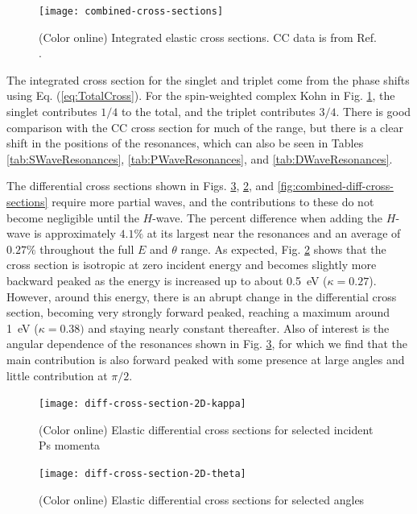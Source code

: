 \documentclass[preprint,showpacs,showkeys,preprintnumbers,amsmath,amssymb,longbibliography,pra,aps]{revtex4-1}
\begin{document}
\begin{figure}[H]
	\centering
	\texttt{[image: combined-cross-sections]}
	\caption{(Color online) Integrated elastic cross sections. CC data is from
Ref. \cite{Walters2004}.}
	\label{fig:combined-cross-sections}
\end{figure}

The integrated cross section for the singlet and triplet come from the phase 
shifts using Eq. (\ref{eq:TotalCross}). For the spin-weighted complex Kohn in 
Fig. \ref{fig:combined-cross-sections}, the singlet contributes $1/4$ to the 
total, and the triplet contributes $3/4$. There is good comparison with the 
CC cross section \cite{Walters2004} for much of the range, but there is a 
clear shift in the positions of the resonances, which can also be seen in 
Tables \ref{tab:SWaveResonances}, \ref{tab:PWaveResonances}, and
\ref{tab:DWaveResonances}.

The differential cross sections shown in Figs.
\ref{fig:diff-cross-section-2D-theta}, \ref{fig:diff-cross-section-2D-kappa},
and \ref{fig:combined-diff-cross-sections} require more partial waves, and
the contributions to these do 
not become negligible until the $H$-wave. The percent difference when adding 
the $H$-wave is approximately $4.1\%$ at its largest near the resonances and an 
average of $0.27\%$ throughout the full $E$ and $\theta$ range. As expected, 
Fig. \ref{fig:diff-cross-section-2D-kappa} shows that the cross section is 
isotropic at zero incident energy and becomes slightly more backward peaked 
as the energy is increased up to about \mbox{0.5 eV} ($\kappa = 0.27$). 
However, around this energy, there is an abrupt change in the differential 
cross section, becoming very strongly forward peaked, reaching a maximum 
around \mbox{1 eV} ($\kappa = 0.38)$ and staying nearly constant thereafter. 
Also of interest is the angular dependence of the resonances shown in Fig. 
\ref{fig:diff-cross-section-2D-theta}, for which we find that the main 
contribution is also forward peaked with some presence at large angles and 
little contribution at $\pi/2$.

\begin{figure}[H]
	\centering
	\texttt{[image: diff-cross-section-2D-kappa]}
	\caption{(Color online) Elastic differential cross sections for selected
incident Ps momenta}
	\label{fig:diff-cross-section-2D-kappa}
\end{figure}

\begin{figure}[H]
	\centering
	\texttt{[image: diff-cross-section-2D-theta]}
	\caption{(Color online) Elastic differential cross sections for selected
angles}
	\label{fig:diff-cross-section-2D-theta}
\end{figure}
\end{document}
